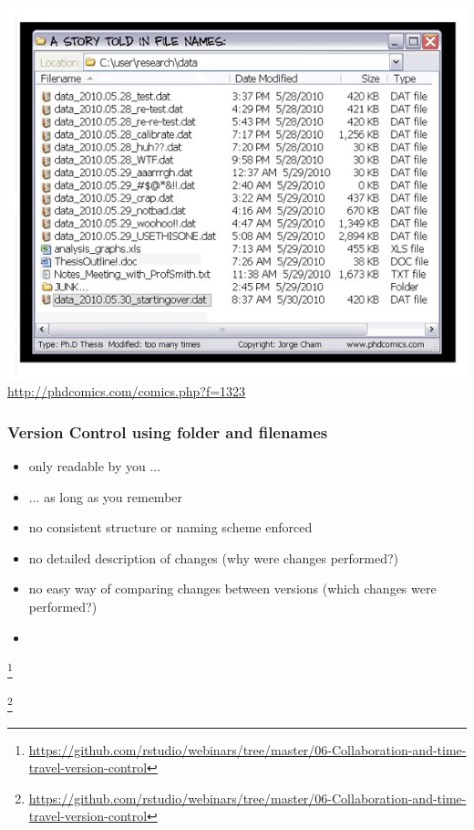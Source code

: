 \documentclass[
t, %
10pt, %
aspectratio=1610, %
ngerman,
english,
]{beamer}
\newcommand\blfootnote[1]{%
  \begingroup
  \renewcommand\thefootnote{}\footnote{#1}%
  \addtocounter{footnote}{-1}%
  \endgroup
}
\begin{document}
\begin{frame}
    \centering
    \includegraphics[height=\textheight]{graphics/phd052810s.jpg}\\
    \url{http://phdcomics.com/comics.php?f=1323}
\end{frame}

\begin{frame}
    \frametitle{Version Control using folder and filenames}
    \begin{itemize}[<+->]
        \item only readable by you ...
        \item ... as long as you remember
        \item no consistent structure or naming scheme enforced
        \item no detailed description of changes (why were changes performed?)
        \item no easy way of comparing changes between versions (which changes were performed?)
        \item \hdots{}
    \end{itemize}
\end{frame}

\begin{frame}
    
    \blfootnote{\url{https://github.com/rstudio/webinars/tree/master/06-Collaboration-and-time-travel-version-control}}
\end{frame}

\begin{frame}
    
    \blfootnote{\url{https://github.com/rstudio/webinars/tree/master/06-Collaboration-and-time-travel-version-control}}
\end{frame}
\end{document}
